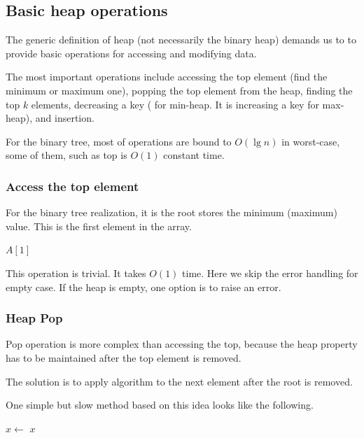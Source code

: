 \documentclass[b5paper]{article}
\begin{document}
\subsection{Basic heap operations}

The generic definition of heap (not necessarily the binary heap)
demands us to to provide basic operations for accessing and modifying data.

The most important operations include accessing the top element
(find the minimum or maximum one), popping the top element
from the heap, finding the top $k$ elements, decreasing a key (
for min-heap. It is increasing a key for max-heap), and
insertion.

For the binary tree, most of operations are bound to $O(\lg n)$ in
worst-case, some of them, such as top is $O(1)$ constant time.

\subsubsection{Access the top element}
For the binary tree realization, it is the
root stores the minimum (maximum) value. This is the first
element in the array.

\begin{algorithmic}[1]
  \State \Return $A[1]$
\EndFunction
\end{algorithmic}

This operation is trivial. It takes $O(1)$ time.
Here we skip the error handling for empty case. If the
heap is empty, one option is to raise an error.

\subsubsection{Heap Pop}

Pop operation is more
complex than accessing the top, because the heap property has to be maintained
after the top element is removed.

The solution is to apply  algorithm to the
next element after the root is removed.

One simple but slow method based on this idea looks like
the following.

\begin{algorithmic}[1]
  \State $x \gets$ 
  \State {}
    \State {}
  \EndIf
  \State \Return $x$
\EndFunction
\end{algorithmic}
\end{document}
